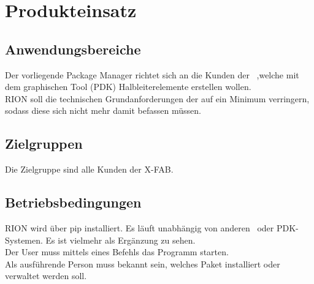 \chapter{Produkteinsatz}

\section{Anwendungsbereiche}
Der vorliegende Package Manager richtet sich an die Kunden der \x~,welche mit dem graphischen Tool (PDK) Halbleiterelemente erstellen wollen. \\
RION soll die technischen Grundanforderungen der  auf ein Minimum verringern, sodass diese sich nicht mehr damit befassen müssen.

\section{Zielgruppen}
Die Zielgruppe sind alle Kunden der X-FAB.


\section{Betriebsbedingungen}
RION wird über pip installiert. Es läuft unabhängig von anderen \x~oder PDK-Systemen. Es ist vielmehr als Ergänzung zu sehen.\\
Der User muss mittels eines Befehls das Programm starten.\\
Als ausführende Person muss bekannt sein, welches Paket installiert oder verwaltet werden soll.
